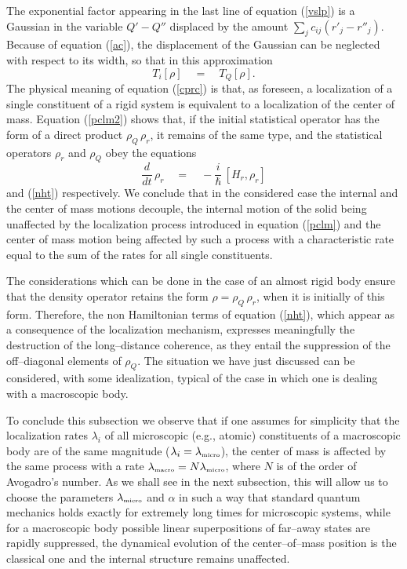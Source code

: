\documentclass[10pt,a4paper]{article}
\begin{document}
The exponential factor appearing in the last line of equation
(\ref{vslp}) is a Gaussian in the variable $Q' - Q''$ displaced by
the amount $\sum_{j} c_{ij} ({r'}_{j} - {r''}_{j})$. Because of
equation (\ref{ac}), the displacement of the Gaussian can be
neglected with respect to its width, so that in this approximation
\begin{equation} \label{cprc}
T_{i}[\rho] \quad = \quad T_{Q}[\rho].
\end{equation}
The physical meaning of equation (\ref{cprc}) is that, as
foreseen, a localization of a single constituent of a rigid system
is equivalent to a localization of the center  of mass. Equation
(\ref{pclm2}) shows that, if the initial statistical operator has
the form of a direct product $\rho_{Q}\, \rho_{r}$, it remains of
the same type, and the statistical operators $\rho_{r}$ and
$\rho_{Q}$ obey the equations
\begin{equation} \label{yjth}
\frac{d}{dt}\, \rho_{r} \quad = \quad -\frac{i}{\hbar}\, [H_{r},
\rho_{r}]
\end{equation}
and (\ref{nht}) respectively. We conclude that in the considered
case the internal and the center of mass motions decouple, the
internal motion of the solid being unaffected by the localization
process introduced in equation (\ref{pclm}) and the center of mass
motion being affected by such a process with a characteristic rate
equal to the sum of the rates for all single constituents.

The considerations which can be done in the case of an almost
rigid body ensure that the density operator retains the form $\rho
= \rho_{Q} \, \rho_{r}$, when it is initially of this form.
Therefore, the non Hamiltonian terms of equation (\ref{nht}),
which appear as a consequence of the localization mechanism,
expresses meaningfully the destruction of the long--distance
coherence, as they entail the suppression of the off--diagonal
elements of $\rho_{Q}$. The situation we have just discussed can
be considered, with some idealization, typical of the case in
which one is dealing with a macroscopic body.

To conclude this subsection we observe that if one assumes for
simplicity that the localization rates $\lambda_{i}$ of all
microscopic (e.g., atomic) constituents of a macroscopic body are
of the same magnitude ($\lambda_{i} = \lambda_{\makebox{\tiny
micro}}$), the center of mass is affected by the same process with
a rate $\lambda_{\makebox{\tiny macro}} = N\lambda_{\makebox{\tiny
micro}}$, where $N$ is of the order of Avogadro's number. As we
shall see in the next subsection, this will allow us to choose the
parameters $\lambda_{\makebox{\tiny micro}}$ and $\alpha$ in such
a way that standard quantum mechanics holds exactly for extremely
long times for microscopic systems, while for a macroscopic body
possible linear superpositions of far--away states are rapidly
suppressed, the dynamical evolution of the center--of--mass
position is the classical one and the internal structure remains
unaffected.
\end{document}
